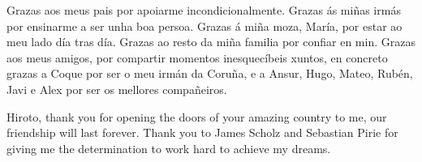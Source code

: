 \documentclass[11pt,a4paper,titlepage,oneside]{report}
\begin{document}

 

 \paxinaenbranco
 \begin{agradecementos}
 Grazas aos meus pais por apoiarme incondicionalmente. Grazas ás miñas irmás por ensinarme a ser unha boa persoa.
 Grazas á miña moza, María, por estar ao meu lado día tras día. Grazas ao resto da miña familia por confiar en 
 min. Grazas aos meus amigos, por compartir momentos inesquecíbeis xuntos, en concreto grazas a Coque por ser o
 meu irmán da Coruña, e a Ansur, Hugo, Mateo, Rubén, Javi e Alex por ser os mellores compañeiros. 

 Hiroto, thank you for opening the doors of your amazing country to me, our friendship will last forever.
 Thank you to James Scholz and Sebastian Pirie for giving me the determination to work hard to achieve my dreams.
 \end{agradecementos}
 

 \setcounter{page}{1}

 \tableofcontents
 \listoffigures
 \listoftables
 \clearpage
 
 \setcounter{page}{1}


 
 
 
 
% 
%
 


 \appendix
 \appendixpage
 

 
 

 \printglossary[type=\acronymtype,title=\nomeglosarioacronimos]
 \printglossary[title=\nomeglosariotermos]

 
 
 \clearpage
 
\end{document}
